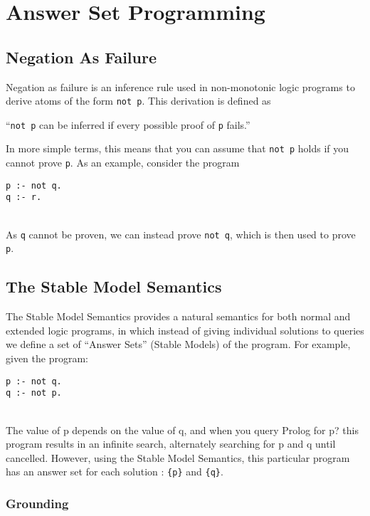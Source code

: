 \section{Answer Set Programming}

\subsection{Negation As Failure}
Negation as failure is an inference rule used in non-monotonic logic programs to derive atoms of the form \lstinline!not p!. This derivation is defined as 
\begin{displayquote}
``\lstinline!not p! can be inferred if every possible proof of \lstinline!p! fails.''
\end{displayquote}
In more simple terms, this means that you can assume that \lstinline!not p! holds if you cannot prove \lstinline!p!. 
As an example, consider the program \\

\begin{lstlisting}
p :- not q.
q :- r.
\end{lstlisting}
\mbox{}\\
As \lstinline!q! cannot be proven, we can instead prove \lstinline!not q!, which is then used to prove \lstinline!p!.

\subsection{The Stable Model Semantics}

The Stable Model Semantics provides a natural semantics for both normal and extended logic programs, in which instead of giving individual solutions to queries we define a set of ``Answer Sets'' (Stable Models) of the program. For example, given the program: \\

\begin{lstlisting}
p :- not q.
q :- not p.
\end{lstlisting}
\mbox{}\\
The value of p depends on the value of q, and when you query Prolog for p? this program results in an infinite search, alternately searching for p and q until cancelled. However, using the Stable Model Semantics, this particular program has an answer set for each solution : \lstinline!{p}! and \lstinline!{q}!.

\pagebreak
\subsubsection{Grounding}

